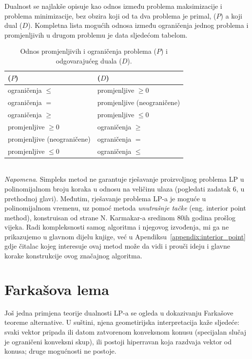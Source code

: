 \documentclass[b5paper, utf8, 11pt, colorlinks]{book}
\theoremstyle{definition}
\begin{document}
Dualnost se najlakše opisuje kao odnos između problema maksimizacije i problema minimizacije, bez obzira koji od ta dva problema je primal, ($P$) a koji   dual ($D$). 
Kompletna lista mogućih odnosa između ograničenja
jednog problema i promjenljivih u drugom problemu je data sljedećom tabelom.
\begin{table}[!ht]
	\centering
	\begin{tabular}{l|l}
		($P$) & ($D$) \\ \hline
		ograničenja $\leq$  & promjenljive $\geq 0$ \\
		ograničenja $=$     & promjenljive (neograničene) \\
		ograničenja $\geq$  & promjenljive $\leq 0$ \\
		promjenljive $\geq 0$    & ograničenja $\geq$ \\
		promjenljive (neograničene) & ograničenja $=$ \\
		promjenljive $\leq 0$         & ograničenja $\leq$ \\ \hline
	\end{tabular}
	
	\caption{Odnos promjenljivih i ograničenja problema ($P$) i odgovarajućeg duala ($D$).}  \label{tab:primal-dual-relation}
\end{table}
\\
\textit{Napomena}. Simpleks metod ne garantuje   rješavanje proizvoljnog problema LP u polinomijalnom broju koraka u odnosu na veličinu ulaza (pogledati zadatak 6, u prethodnoj glavi). %
Međutim, rješavanje problema LP-a je moguće u polinomijalnom vremenu, uz pomoć metoda \emph{unutrašnje tačke} (eng. interior point method), konstruisan od strane N. Karmakar-a sredinom 80ih godina prošlog vijeka. Radi kompleksnosti samog algoritma i njegovog izvođenja, mi ga ne prikazujemo u glavnom dijelu knjige, već u Apendiksu~\ref{appendix:interior_point} gdje čitalac kojeg interesuje ovaj metod može da vidi i prouči ideju i glavne korake konstrukcije ovog značajnog algoritma. 

\section{Farkašova lema}
Još jedna primjena teorije dualnosti LP-a se ogleda u dokazivanju Farkašove teoreme alternative. U suštini, njena geometirijska interpretacija kaže sljedeće: svaki vektor pripada ili datom zatvorenom konveksnom konusu (specijalan slučaj je ograničeni konveksni skup), ili postoji hiperravan koja razdvaja vektor od konusa; druge mogućnosti ne postoje. 
\end{document}
